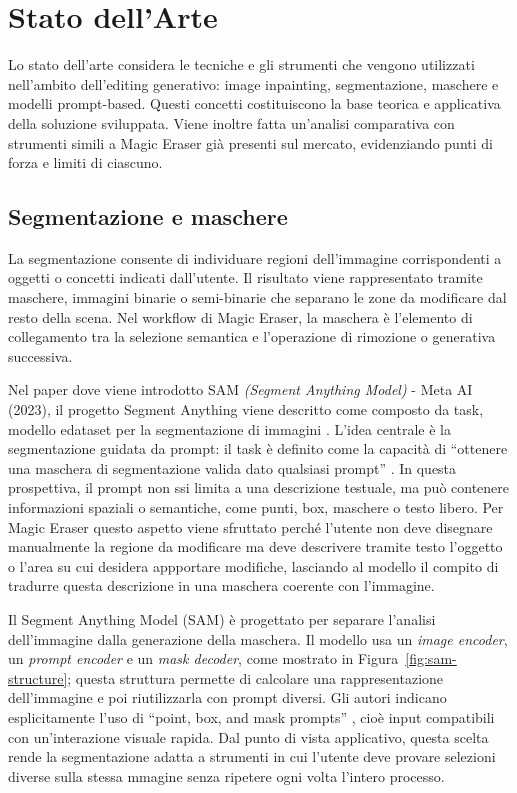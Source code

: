 \documentclass[oneside]{supsistudent}
\begin{document}
\chapter{Stato dell'Arte}

Lo stato dell'arte considera le tecniche e gli strumenti che vengono utilizzati
nell'ambito dell'editing generativo: image inpainting, segmentazione,
maschere e modelli prompt-based. Questi concetti costituiscono la base teorica e
applicativa della soluzione sviluppata.
Viene inoltre fatta un'analisi comparativa con strumenti simili a Magic Eraser già
presenti sul mercato, evidenziando punti di forza e limiti di ciascuno.



\section{Segmentazione e maschere}

La segmentazione consente di individuare regioni dell'immagine corrispondenti a
oggetti o concetti indicati dall'utente. Il risultato viene
rappresentato tramite maschere, immagini binarie o semi-binarie che separano le zone
da modificare dal resto della scena. Nel workflow di
Magic Eraser, la maschera è l'elemento di collegamento tra la selezione semantica e
l'operazione di rimozione o generativa successiva.

Nel paper dove viene introdotto SAM \textit{(Segment Anything Model)} - Meta AI (2023),
il progetto Segment Anything viene descritto come composto da task,
modello edataset per la segmentazione di immagini \cite{sam}.
L'idea centrale è la segmentazione guidata da prompt: il task è definito
come la capacità di ``ottenere una maschera di segmentazione valida dato qualsiasi prompt''
\cite{sam}. In questa prospettiva, il prompt non ssi limita a una
descrizione testuale, ma può contenere informazioni spaziali o semantiche,
come punti, box, maschere o testo libero. Per Magic Eraser questo
aspetto viene sfruttato perché l'utente non deve disegnare
manualmente la regione da modificare ma deve descrivere tramite testo l'oggetto o l'area
su cui desidera appportare modifiche, lasciando al modello il compito di
tradurre questa descrizione in una maschera coerente con l'immagine.

Il Segment Anything Model (SAM) è progettato per separare l'analisi
dell'immagine dalla generazione della maschera. Il modello usa un
\textit{image encoder}, un \textit{prompt encoder} e un \textit{mask decoder},
come mostrato in Figura~\ref{fig:sam-structure}; questa struttura permette di
calcolare una rappresentazione
dell'immagine e poi riutilizzarla con prompt diversi. Gli autori indicano
esplicitamente l'uso di ``point, box, and mask prompts''
\cite{sam}, cioè input compatibili con un'interazione visuale rapida. Dal punto
di vista applicativo, questa scelta rende la segmentazione
adatta a strumenti in cui l'utente deve provare selezioni diverse sulla stessa
mmagine senza ripetere ogni volta l'intero processo.
\end{document}
